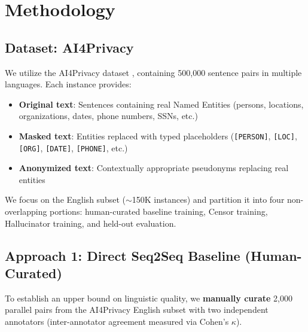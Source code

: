 \documentclass[9pt]{article}
\begin{document}
\section{Methodology}

\subsection{Dataset: AI4Privacy}
We utilize the AI4Privacy dataset \cite{pilán2022ai4privacy}, containing 500,000 sentence pairs in multiple languages. Each instance provides:
\begin{itemize}
    \item \textbf{Original text}: Sentences containing real Named Entities (persons, locations, organizations, dates, phone numbers, SSNs, etc.)
    \item \textbf{Masked text}: Entities replaced with typed placeholders (\texttt{[PERSON]}, \texttt{[LOC]}, \texttt{[ORG]}, \texttt{[DATE]}, \texttt{[PHONE]}, etc.)
    \item \textbf{Anonymized text}: Contextually appropriate pseudonyms replacing real entities
\end{itemize}
We focus on the English subset ($\sim$150K instances) and partition it into four non-overlapping portions: human-curated baseline training, Censor training, Hallucinator training, and held-out evaluation.

\subsection{Approach 1: Direct Seq2Seq Baseline (Human-Curated)}

To establish an upper bound on linguistic quality, we \textbf{manually curate} 2,000 parallel pairs from the AI4Privacy English subset with two independent annotators (inter-annotator agreement measured via Cohen's $\kappa$).
\end{document}

